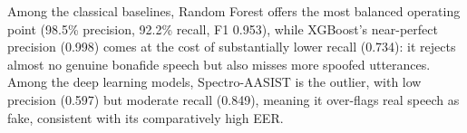Among the classical baselines, Random Forest offers the most balanced operating point (98.5\% precision, 92.2\% recall, F1 0.953), while XGBoost's near-perfect precision (0.998) comes at the cost of substantially lower recall (0.734): it rejects almost no genuine bonafide speech but also misses more spoofed utterances. Among the deep learning models, Spectro-AASIST is the outlier, with low precision (0.597) but moderate recall (0.849), meaning it over-flags real speech as fake, consistent with its comparatively high EER.